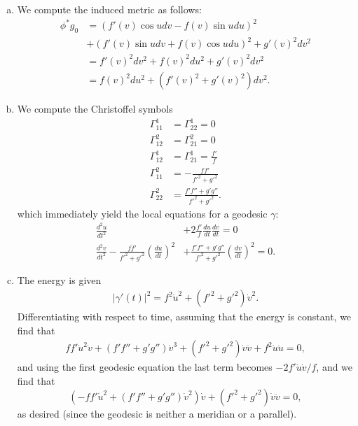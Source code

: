 \documentclass{../mathnotes}
\begin{document}
\begin{enumerate}[(a)]
    \item We compute the induced metric as follows:
        \begin{align*}
            \phi^*g_0 &= \left( f'(v)\cos u dv-f(v)\sin u du \right)^2\\
            &+(f'(v)\sin u dv + f(v)\cos u du)^2 + g'(v)^2 dv^2\\
            &= f'(v)^2dv^2+f(v)^2du^2+g'(v)^2dv^2\\
            &= f(v)^2 du^2 + \left( f'(v)^2+g'(v)^2 \right)dv^2.
        \end{align*}
    \item We compute the Christoffel symbols
        \begin{align*}
            \Gamma_{11}^1&=\Gamma_{22}^1 = 0\\
            \Gamma_{12}^2&=\Gamma_{21}^2 = 0\\
            \Gamma_{12}^1&=\Gamma_{21}^1 =\frac{f'}{f}\\
            \Gamma_{11}^2 &= -\frac{ff'}{f'^2+g'^2}\\
            \Gamma_{22}^2 &= \frac{f'f''+g'g''}{f'^2+g'^2}.
        \end{align*}
        which immediately yield the local equations for a geodesic $\gamma$:
        \begin{align*}
            \frac{d^2u}{dt^2}&+2\frac{f'}{f}\frac{du}{dt}\frac{dv}{dt} = 0\\
            \frac{d^2v}{dt^2}-\frac{ff'}{f'^2+g'^2}\left(\frac{du}{dt}\right)^2&+\frac{f'f''+g'g''}{f'^2+g'^2}\left( \frac{dv}{dt} \right)^2=0.
        \end{align*}
    \item The energy is given
        \begin{align*}
            |\gamma'(t)|^2=f^2\dot u^2+(f'^2+g'^2)\dot v^2.
        \end{align*}
        Differentiating with respect to time, assuming that the energy is constant, we find that
        \begin{align*}
            ff'\dot u^2\dot v+(f'f''+g'g'')\dot v^3+(f'^2+g'^2)\dot v\ddot v+f^2\dot u\ddot u=0,
        \end{align*}
        and using the first geodesic equation the last term becomes $-2f'\dot u\dot v/f$,
        and we find that
        \[\left(-ff'\dot u^2+(f'f''+g'g'') \dot v^2\right)\dot v+(f'^2+g'^2)\dot v\ddot v=0,\]
        as desired (since the geodesic is neither a meridian or a parallel).


\end{enumerate}
\end{document}
